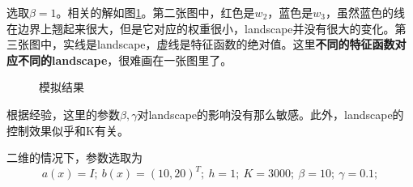 \documentclass[12pt,a4paper]{article}
\begin{document}
选取$\beta=1$。相关的解如图\ref{fb1}。第二张图中，红色是$w_2$，蓝色是$w_3$，虽然蓝色的线在边界上翘起来很大，但是它对应的权重很小，landscape并没有很大的变化。第三张图中，实线是landscape，虚线是特征函数的绝对值。这里\textbf{不同的特征函数对应不同的landscape}，很难画在一张图里了。
\begin{figure}[h]
\centering
{}
\caption{模拟结果}
\label{fb1}
\end{figure}

根据经验，这里的参数$\beta, \gamma$对landscape的影响没有那么敏感。此外，landscape的控制效果似乎和K有关。

二维的情况下，参数选取为
$$ a(x) = I; \ b(x) = (10, 20)^T; \ h = 1; \ K = 3000; \ \beta = 10; \ \gamma = 0.1; $$
\end{document}
